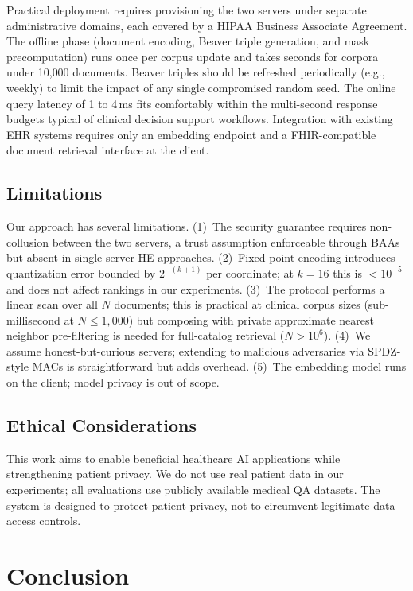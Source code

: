 \documentclass[conference]{IEEEtran}
\begin{document}
Practical deployment requires provisioning the two servers under separate
administrative domains, each covered by a HIPAA Business Associate Agreement.
The offline phase (document encoding, Beaver triple generation, and mask
precomputation) runs once per corpus update and takes seconds for corpora
under 10{,}000 documents. Beaver triples should be refreshed periodically
(e.g., weekly) to limit the impact of any single compromised random seed.
The online query latency of 1 to 4\,ms fits comfortably within the
multi-second response budgets typical of clinical decision support workflows.
Integration with existing EHR systems requires only an embedding endpoint
and a FHIR-compatible document retrieval interface at the client.


\subsection{Limitations}

Our approach has several limitations.
(1)~The security guarantee requires non-collusion between the two servers,
a trust assumption enforceable through BAAs but absent in single-server HE
approaches.
(2)~Fixed-point encoding introduces quantization error bounded by
$2^{-(k+1)}$ per coordinate; at $k=16$ this is $< 10^{-5}$ and does not
affect rankings in our experiments.
(3)~The protocol performs a linear scan over all $N$ documents; this is
practical at clinical corpus sizes (sub-millisecond at $N \leq 1{,}000$)
but composing with private approximate nearest neighbor pre-filtering is
needed for full-catalog retrieval ($N > 10^6$).
(4)~We assume honest-but-curious servers; extending to malicious adversaries
via SPDZ-style MACs \cite{damgard2012spdz} is straightforward but adds overhead.
(5)~The embedding model runs on the client; model privacy is out of scope.


\subsection{Ethical Considerations}

This work aims to enable beneficial healthcare AI applications while
strengthening patient privacy. We do not use real patient data in our
experiments; all evaluations use publicly available medical QA datasets.
The system is designed to protect patient privacy, not to circumvent
legitimate data access controls.


\section{Conclusion}
\label{sec:conclusion}
\end{document}
